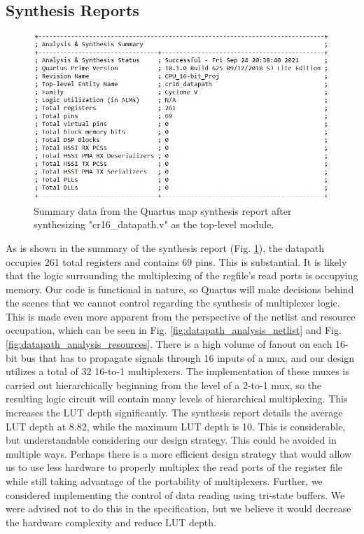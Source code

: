 \documentclass[conference]{IEEEtran}
\begin{document}
\subsection{Synthesis Reports}
\begin{figure}[h]
    \centering
    \includegraphics[scale=0.5]{resources/figures/analysis_and_synthesis_summary.JPG}
    \caption{Summary data from the Quartus map synthesis report after synthesizing "cr16\_datapath.v" as the top-level module.}
    \label{fig:datapath_analysis_summary}
\end{figure}

As is shown in the summary of the synthesis report (Fig. \ref{fig:datapath_analysis_summary}), the datapath occupies 261 total registers and contains 69 pins. This is substantial. It is likely that the logic surrounding the multiplexing of the regfile's read ports is occupying memory. Our code is functional in nature, so Quartus will make decisions behind the scenes that we cannot control regarding the synthesis of multiplexer logic. This is made even more apparent from the perspective of the netlist and resource occupation, which can be seen in Fig. \ref{fig:datapath_analysis_netlist} and Fig. \ref{fig:datapath_analysis_resources}. There is a high volume of fanout on each 16-bit bus that has to propagate signals through 16 inputs of a mux, and our design utilizes a total of 32 16-to-1 multiplexers. The implementation of these muxes is carried out hierarchically beginning from the level of a 2-to-1 mux, so the resulting logic circuit will contain many levels of hierarchical multiplexing. This increases the LUT depth significantly. The synthesis report details the average LUT depth at 8.82, while the maximum LUT depth is 10. This is considerable, but understandable considering our design strategy. This could be avoided in multiple ways. Perhaps there is a more efficient design strategy that would allow us to use less hardware to properly multiplex the read ports of the register file while still taking advantage of the portability of multiplexers. Further, we considered implementing the control of data reading using tri-state buffers. We were advised not to do this in the specification, but we believe it would decrease the hardware complexity and reduce LUT depth.
\end{document}
